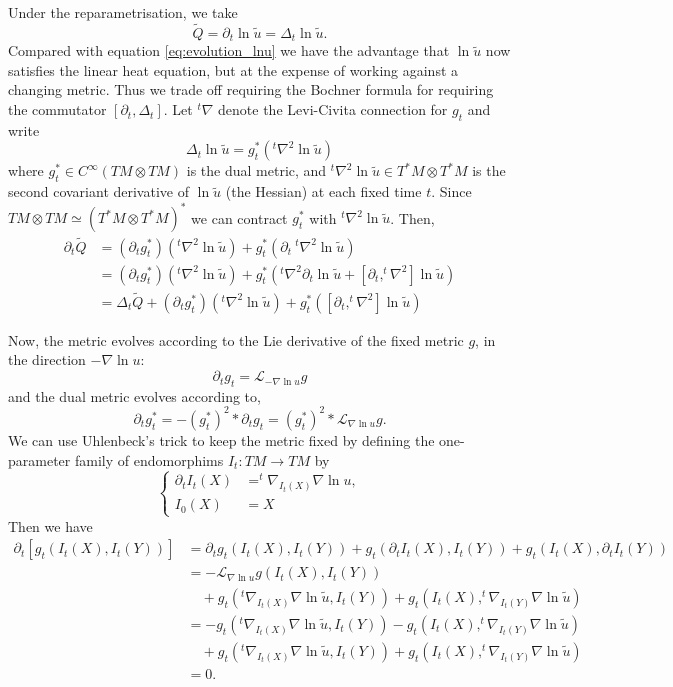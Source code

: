 Under the reparametrisation, we take
\[
\tilde{Q} = \partial_t \ln \tilde{u} = \Delta_t \ln \tilde{u}.
\]
Compared with equation \eqref{eq:evolution_lnu} we have the advantage that $\ln \tilde{u}$ now satisfies the linear heat equation, but at the expense of working against a changing metric. Thus we trade off requiring the Bochner formula for requiring the commutator $[\partial_t, \Delta_t]$. Let $^t\nabla$ denote the Levi-Civita connection for $g_t$ and write
\[
\Delta_t \ln \tilde{u} = g_t^{\ast} (^t\nabla^2 \ln \tilde{u})
\]
where $g_t^{\ast} \in C^{\infty} \left(TM \otimes TM\right)$ is the dual metric, and $^t\nabla^2 \ln \tilde{u} \in T^{\ast} M \otimes T^{\ast} M$ is the second covariant derivative of $\ln \tilde{u}$ (the Hessian) at each fixed time $t$. Since $TM \otimes TM \simeq (T^{\ast} M \otimes T^{\ast} M)^{\ast}$ we can contract $g_t^{\ast}$ with $^t\nabla^2 \ln \tilde{u}$. Then,
\begin{equation}
\label{eq:dt_delta_commutator}
\begin{split}
\partial_t \tilde{Q} &= \left(\partial_t g_t^{\ast}\right) (^t\nabla^2 \ln \tilde{u}) + g_t^{\ast} (\partial_t \> ^t\nabla^2 \ln \tilde{u}) \\
&= \left(\partial_t g_t^{\ast}\right) \left(^t\nabla^2 \ln \tilde{u}\right) + g_t^{\ast} \left(^t\nabla^2 \partial_t \ln \tilde{u} + [\partial_t, ^t\nabla^2] \ln \tilde{u}\right) \\
&= \Delta_t \tilde{Q} + \left(\partial_t g_t^{\ast}\right) \left(^t\nabla^2 \ln \tilde{u}\right) + g_t^{\ast} \left([\partial_t, ^t\nabla^2] \ln \tilde{u}\right)
\end{split}
\end{equation}

Now, the metric evolves according to the Lie derivative of the fixed metric $g$, in the direction $-\nabla \ln u$:
\[
\partial_t g_t = \mathcal{L}_{-\nabla \ln u} g
\]
and the dual metric evolves according to,
\[
\partial_t g_t^{\ast} = -(g_t^{\ast})^2 \ast \partial_t g_t = (g_t^{\ast})^2 \ast \mathcal{L}_{\nabla \ln u} g.
\]
We can use Uhlenbeck's trick to keep the metric fixed by defining the one-parameter family of endomorphims $I_t : TM \to TM$ by
\[
\begin{cases}
\partial_t I_t (X) &= ^t\nabla_{I_t(X)} \nabla \ln u, \\
I_0(X) & = X
\end{cases}
\]
Then we have
\[
\begin{split}
\partial_t \left[g_t(I_t(X), I_t(Y))\right] &= \partial_t g_t (I_t(X), I_t(Y)) + g_t (\partial_t I_t(X), I_t(Y)) + g_t (I_t(X), \partial_t I_t(Y)) \\
&= - \mathcal{L}_{\nabla \ln u} g (I_t(X), I_t(Y)) \\
&\quad + g_t(^t\nabla_{I_t(X)} \nabla \ln \tilde{u}, I_t(Y)) + g_t(I_t(X), ^t\nabla_{I_t(Y)} \nabla \ln \tilde{u}) \\
&= - g_t(^t\nabla_{I_t(X)} \nabla \ln \tilde{u}, I_t(Y)) - g_t(I_t(X), ^t\nabla_{I_t(Y)} \nabla \ln \tilde{u}) \\
&\quad + g_t(^t\nabla_{I_t(X)} \nabla \ln \tilde{u}, I_t(Y)) + g_t(I_t(X), ^t\nabla_{I_t(Y)} \nabla \ln \tilde{u}) \\
&= 0.
\end{split}
\]

